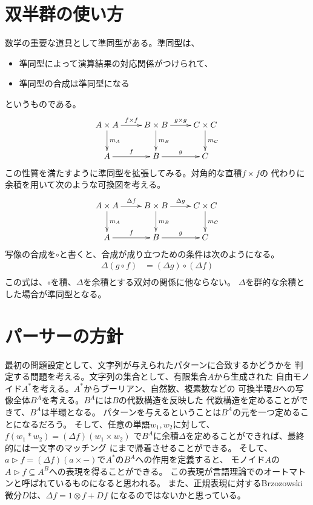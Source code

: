 \section{双半群の使い方}\label{s1:双半群の使い方} %
	数学の重要な道具として準同型がある。準同型は、
	\begin{itemize}
		\item 準同型によって演算結果の対応関係がつけられて、
		\item 準同型の合成は準同型になる
	\end{itemize}
	というものである。
	\begin{equation*}\xymatrix{
		A\times A \ar[d]^{m_A} \ar[r]^{f\times f} & B\times B \ar[d]^{m_B} \ar[r]^{g\times g} & C\times C \ar[d]^{m_C} \\
		A \ar[r]^{f} & B \ar[r]^{g} & C \\
	}\end{equation*}
	この性質を満たすように準同型を拡張してみる。対角的な直積$f\times f$の
	代わりに余積を用いて次のような可換図を考える。
	\begin{equation*}\xymatrix{
		A\times A \ar[d]^{m_A} \ar[r]^{\Delta f} & B\times B \ar[d]^{m_B} \ar[r]^{\Delta g} & C\times C \ar[d]^{m_C} \\
		A \ar[r]^{f} & B \ar[r]^{g} & C \\
	}\end{equation*}
	写像の合成を$\circ$と書くと、合成が成り立つための条件は次のようになる。
	\begin{equation*}\begin{split} %
		\Delta(g\circ f) &= (\Delta g)\circ(\Delta f) \\
	\end{split}\end{equation*} %
	この式は、$\circ$を積、$\Delta$を余積とする双対の関係に他ならない。
	$\Delta$を群的な余積とした場合が準同型となる。

\section{パーサーの方針}\label{s1:パーサーの方針} %
	最初の問題設定として、文字列が与えられたパターンに合致するかどうかを
	判定する問題を考える。文字列の集合として、有限集合$A$から生成された
	自由モノイド$A^*$を考える。$A^*$からブーリアン、自然数、複素数などの
	可換半環$B$への写像全体$B^A$を考える。$B^A$には$B$の代数構造を反映した
	代数構造を定めることができて、$B^A$は半環となる。
	パターンを与えるということは$B^A$の元を一つ定めることになるだろう。
	そして、任意の単語$w_1,w_2$に対して、$f(w_1*w_2)=(\Delta f)(w_1\times w_2)$
	で$B^A$に余積$\Delta$を定めることができれば、最終的には一文字のマッチング
	にまで帰着させることができる。
	そして、$a\rhd f=(\Delta f)(a\times-)$で$A^*$の$B^A$への作用を定義すると、
	モノイド$A$の$A\rhd f\subseteq A^B$への表現を得ることができる。
	この表現が言語理論でのオートマトンと呼ばれているものになると思われる。
	また、正規表現に対するBrzozowski微分$D$は、$\Delta f=1\otimes f + Df$
	になるのではないかと思っている。

